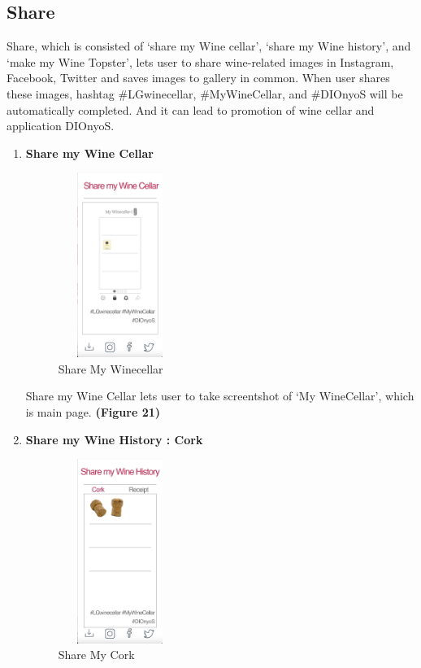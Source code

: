 \documentclass[sigconf, nonacm]{acmart}
\begin{document}
\subsection{Share}
Share, which is consisted of ‘share my Wine cellar’,
‘share my Wine history’, and ‘make my Wine Topster’,
lets user to share wine-related images in Instagram,
Facebook, Twitter and saves images to gallery in
common. When user shares these images, hashtag
\#LGwinecellar, \#MyWineCellar, and \#DIOnyoS will
be automatically completed. And it can lead to
promotion of wine cellar and application DIOnyoS.
\begin{enumerate}
    \item \textbf{Share my Wine Cellar}\\
    \begin{figure}
  \centering
  \includegraphics[width=4cm, height=6cm]{sharecel.png}
  \caption{Share My Winecellar}
  \label{fig:wine arrival}
\end{figure}
Share my Wine Cellar lets user to take screentshot
of ‘My WineCellar’, which is main page. \textbf{(Figure 21)}
    \item \textbf{Share my Wine History : Cork}\\
     \begin{figure}
  \centering
  \includegraphics[width=4cm, height=6cm]{sharecork.png}
  \caption{Share My Cork}
  \label{fig:wine arrival}

\end{figure}
\end{enumerate}
\end{document}
